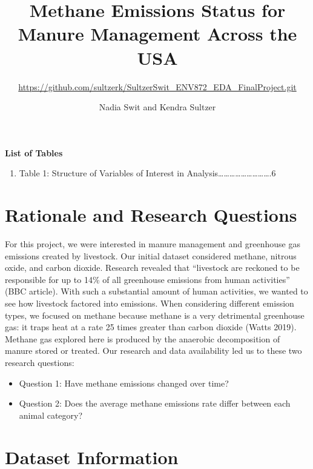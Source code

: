 \documentclass[
  12pt,
]{article}
\title{Methane Emissions Status for Manure Management Across the USA}
\subtitle{\url{https://github.com/sultzerk/SultzerSwit_ENV872_EDA_FinalProject.git}}
\author{Nadia Swit and Kendra Sultzer}
\date{}
\providecommand{\tightlist}{%
  \setlength{\itemsep}{0pt}\setlength{\parskip}{0pt}}
\begin{document}
\maketitle

\newpage
\tableofcontents 
\newpage

\textbf{List of Tables}

\begin{enumerate}
\def\labelenumi{\arabic{enumi}.}
\tightlist
\item
  Table 1: Structure of Variables of Interest in
  Analysis\ldots\ldots\ldots\ldots\ldots\ldots\ldots\ldots\ldots.6
  \newpage

  \listoffigures 
  \newpage
\end{enumerate}

\hypertarget{rationale-and-research-questions}{%
\section{Rationale and Research
Questions}\label{rationale-and-research-questions}}

For this project, we were interested in manure management and greenhouse
gas emissions created by livestock. Our initial dataset considered
methane, nitrous oxide, and carbon dioxide. Research revealed that
``livestock are reckoned to be responsible for up to 14\% of all
greenhouse emissions from human activities'' (BBC article). With such a
substantial amount of human activities, we wanted to see how livestock
factored into emissions. When considering different emission types, we
focused on methane because methane is a very detrimental greenhouse gas:
it traps heat at a rate 25 times greater than carbon dioxide (Watts
2019). Methane gas explored here is produced by the anaerobic
decomposition of manure stored or treated. Our research and data
availability led us to these two research questions:

\begin{itemize}
\item
  Question 1: Have methane emissions changed over time?
\item
  Question 2: Does the average methane emissions rate differ between
  each animal category?
\end{itemize}

\newpage

\hypertarget{dataset-information}{%
\section{Dataset Information}\label{dataset-information}}
\end{document}
